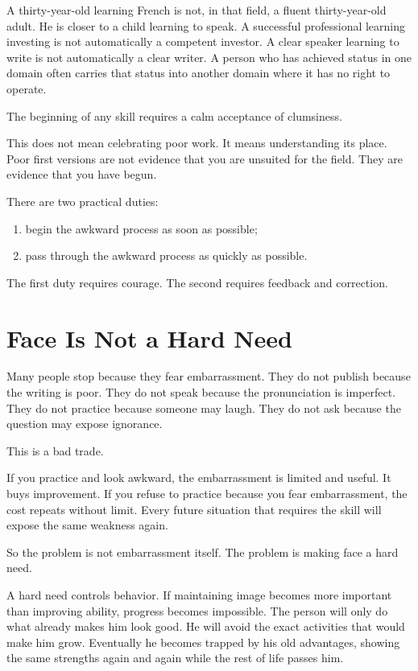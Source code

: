 A thirty-year-old learning French is not, in that field, a fluent thirty-year-old adult. He is closer to a child learning to speak. A successful professional learning investing is not automatically a competent investor. A clear speaker learning to write is not automatically a clear writer. A person who has achieved status in one domain often carries that status into another domain where it has no right to operate.

The beginning of any skill requires a calm acceptance of clumsiness.

This does not mean celebrating poor work. It means understanding its place. Poor first versions are not evidence that you are unsuited for the field. They are evidence that you have begun.

There are two practical duties:

\begin{enumerate}
\item begin the awkward process as soon as possible;
\item pass through the awkward process as quickly as possible.
\end{enumerate}

The first duty requires courage. The second requires feedback and correction.

\section*{Face Is Not a Hard Need}

Many people stop because they fear embarrassment. They do not publish because the writing is poor. They do not speak because the pronunciation is imperfect. They do not practice because someone may laugh. They do not ask because the question may expose ignorance.

This is a bad trade.

If you practice and look awkward, the embarrassment is limited and useful. It buys improvement. If you refuse to practice because you fear embarrassment, the cost repeats without limit. Every future situation that requires the skill will expose the same weakness again.

So the problem is not embarrassment itself. The problem is making face a hard need.

A hard need controls behavior. If maintaining image becomes more important than improving ability, progress becomes impossible. The person will only do what already makes him look good. He will avoid the exact activities that would make him grow. Eventually he becomes trapped by his old advantages, showing the same strengths again and again while the rest of life passes him.

